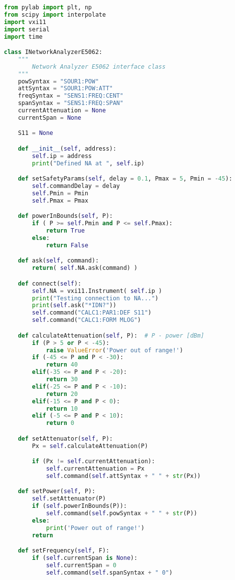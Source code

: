 \begin{lstlisting}[language=Python]
from pylab import plt, np
from scipy import interpolate
import vxi11
import serial
import time

class INetworkAnalyzerE5062:
    """
        Network Analyzer E5062 interface class
    """
    powSyntax = "SOUR1:POW"
    attSyntax = "SOUR1:POW:ATT"
    freqSyntax = "SENS1:FREQ:CENT"
    spanSyntax = "SENS1:FREQ:SPAN"
    currentAttenuation = None
    currentSpan = None

    S11 = None

    def __init__(self, address):
        self.ip = address
        print("Defined NA at ", self.ip)

    def setSafetyParams(self, delay = 0.1, Pmax = 5, Pmin = -45):
        self.commandDelay = delay
        self.Pmin = Pmin
        self.Pmax = Pmax

    def powerInBounds(self, P):
        if ( P >= self.Pmin and P <= self.Pmax):
            return True
        else:
            return False

    def ask(self, command):
        return( self.NA.ask(command) )

    def connect(self):
        self.NA = vxi11.Instrument( self.ip )
        print("Testing connection to NA...")
        print(self.ask("*IDN?"))
        self.command("CALC1:PAR1:DEF S11")
        self.command("CALC1:FORM MLOG")

    def calculateAttenuation(self, P):  # P - power [dBm]
        if (P > 5 or P < -45):
            raise ValueError('Power out of range!')
        if (-45 <= P and P < -30):
            return 40
        elif(-35 <= P and P < -20):
            return 30
        elif(-25 <= P and P < -10):
            return 20
        elif(-15 <= P and P < 0):
            return 10
        elif (-5 <= P and P < 10):
            return 0

    def setAttenuator(self, P):
        Px = self.calculateAttenuation(P)

        if (Px != self.currentAttenuation):
            self.currentAttenuation = Px
            self.command(self.attSyntax + " " + str(Px))

    def setPower(self, P):
        self.setAttenuator(P)
        if (self.powerInBounds(P)):
            self.command(self.powSyntax + " " + str(P))
        else:
            print('Power out of range!')
        return

    def setFrequency(self, F):
        if (self.currentSpan is None):
            self.currentSpan = 0
            self.command(self.spanSyntax + " 0")


\end{lstlisting}

